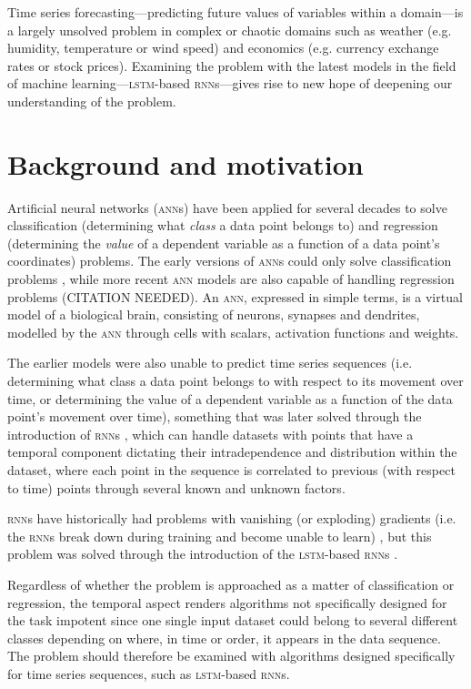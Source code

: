 Time series forecasting---predicting future values of variables within a
domain---is a largely unsolved problem in complex or chaotic domains such as
weather (e.g. humidity, temperature or wind speed) and economics (e.g. currency
exchange rates or stock prices).  Examining the problem with the latest models
in the field of machine learning---\textsc{lstm}-based \textsc{rnn}s---gives
rise to new hope of deepening our understanding of the problem.

\section{Background and motivation}
Artificial neural networks (\textsc{ann}s) have been applied for several decades
to solve classification (determining what \textit{class} a data point belongs
to) and regression (determining the \textit{value} of a dependent variable as a
function of a data point's coordinates) problems.  The early versions of
\textsc{ann}s could only solve classification problems \citep{rosenblatt1958},
while more recent \textsc{ann} models are also capable of handling regression
problems (CITATION NEEDED).  An \textsc{ann}, expressed in simple terms, is a
virtual model of a biological brain, consisting of neurons, synapses and
dendrites, modelled by the \textsc{ann} through cells with scalars, activation
functions and weights.

The earlier models were also unable to predict time series sequences (i.e.
determining what class a data point belongs to with respect to its movement over
time, or determining the value of a dependent variable as a function of the data
point's movement over time), something that was later solved through the
introduction of \textsc{rnn}s \citep*{rumelhart1986}, which can handle datasets with
points that have a temporal component dictating their intradependence and
distribution within the dataset, where each point in the sequence is correlated
to previous (with respect to time) points through several known and unknown
factors.

\textsc{rnn}s have historically had problems with vanishing (or exploding)
gradients (i.e. the \textsc{rnn}s break down during training and become unable
to learn) \citep{pascanu2012}, but this problem was solved through the
introduction of the \textsc{lstm}-based \textsc{rnn}s \citep*{hochreiter1997}.

Regardless of whether the problem is approached as a matter of classification or
regression, the temporal aspect renders algorithms not specifically designed for
the task impotent since one single input dataset could belong to several
different classes depending on where, in time or order, it appears in the data
sequence.  The problem should therefore be examined with algorithms designed
specifically for time series sequences, such as \textsc{lstm}-based
\textsc{rnn}s.

